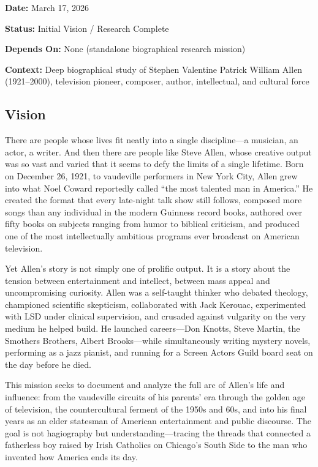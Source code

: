 \documentclass[11pt,letterpaper]{article}
\newcommand{\metafield}[2]{\textbf{\sffamily #1} #2\par}
\begin{document}
\metafield{Date:}{March 17, 2026}
\metafield{Status:}{Initial Vision / Research Complete}
\metafield{Depends On:}{None (standalone biographical research mission)}
\metafield{Context:}{Deep biographical study of Stephen Valentine Patrick William Allen (1921--2000), television pioneer, composer, author, intellectual, and cultural force}

\subsection{Vision}

There are people whose lives fit neatly into a single discipline---a musician, an actor, a writer. And then there are people like Steve Allen, whose creative output was so vast and varied that it seems to defy the limits of a single lifetime. Born on December 26, 1921, to vaudeville performers in New York City, Allen grew into what Noel Coward reportedly called ``the most talented man in America.'' He created the format that every late-night talk show still follows, composed more songs than any individual in the modern Guinness record books, authored over fifty books on subjects ranging from humor to biblical criticism, and produced one of the most intellectually ambitious programs ever broadcast on American television.

Yet Allen's story is not simply one of prolific output. It is a story about the tension between entertainment and intellect, between mass appeal and uncompromising curiosity. Allen was a self-taught thinker who debated theology, championed scientific skepticism, collaborated with Jack Kerouac, experimented with LSD under clinical supervision, and crusaded against vulgarity on the very medium he helped build. He launched careers---Don Knotts, Steve Martin, the Smothers Brothers, Albert Brooks---while simultaneously writing mystery novels, performing as a jazz pianist, and running for a Screen Actors Guild board seat on the day before he died.

This mission seeks to document and analyze the full arc of Allen's life and influence: from the vaudeville circuits of his parents' era through the golden age of television, the countercultural ferment of the 1950s and 60s, and into his final years as an elder statesman of American entertainment and public discourse. The goal is not hagiography but understanding---tracing the threads that connected a fatherless boy raised by Irish Catholics on Chicago's South Side to the man who invented how America ends its day.
\end{document}
